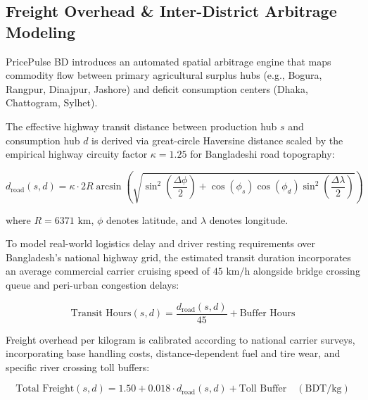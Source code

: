 \subsection{Freight Overhead \& Inter-District Arbitrage Modeling}
PricePulse BD introduces an automated spatial arbitrage engine that maps commodity flow between primary agricultural surplus hubs (e.g., Bogura, Rangpur, Dinajpur, Jashore) and deficit consumption centers (Dhaka, Chattogram, Sylhet).

The effective highway transit distance between production hub $s$ and consumption hub $d$ is derived via great-circle Haversine distance scaled by the empirical highway circuity factor $\kappa = 1.25$ for Bangladeshi road topography:

\begin{equation}
d_{\text{road}}(s, d) = \kappa \cdot 2 R \arcsin \left( \sqrt{\sin^2\left(\frac{\Delta \phi}{2}\right) + \cos(\phi_s) \cos(\phi_d) \sin^2\left(\frac{\Delta \lambda}{2}\right)} \right)
\end{equation}

where $R = 6371\text{ km}$, $\phi$ denotes latitude, and $\lambda$ denotes longitude. 

To model real-world logistics delay and driver resting requirements over Bangladesh's national highway grid, the estimated transit duration incorporates an average commercial carrier cruising speed of $45\text{ km/h}$ alongside bridge crossing queue and peri-urban congestion delays:

\begin{equation}
\text{Transit Hours}(s, d) = \frac{d_{\text{road}}(s, d)}{45} + \text{Buffer Hours}
\end{equation}

Freight overhead per kilogram is calibrated according to national carrier surveys, incorporating base handling costs, distance-dependent fuel and tire wear, and specific river crossing toll buffers:

\begin{equation}
\text{Total Freight}(s, d) = 1.50 + 0.018 \cdot d_{\text{road}}(s, d) + \text{Toll Buffer} \quad (\text{BDT/kg})
\end{equation}

